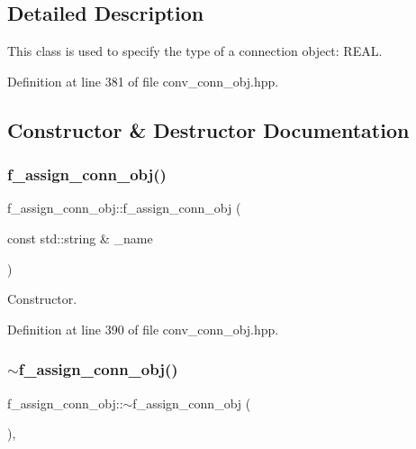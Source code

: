 \subsection{Detailed Description}
This class is used to specify the type of a connection object\+: R\+E\+AL. 

Definition at line 381 of file conv\+\_\+conn\+\_\+obj.\+hpp.



\subsection{Constructor \& Destructor Documentation}
\mbox{\label{classf__assign__conn__obj_a555ff56711d5808d1cd3904b9672a767}} 
\subsubsection{\texorpdfstring{f\+\_\+assign\+\_\+conn\+\_\+obj()}{f\_assign\_conn\_obj()}}
{\footnotesize\ttfamily f\+\_\+assign\+\_\+conn\+\_\+obj\+::f\+\_\+assign\+\_\+conn\+\_\+obj (\begin{DoxyParamCaption}\item[{const std\+::string \&}]{\+\_\+name }\end{DoxyParamCaption})\hspace{0.3cm}{\ttfamily [inline]}}



Constructor. 



Definition at line 390 of file conv\+\_\+conn\+\_\+obj.\+hpp.

\mbox{\label{classf__assign__conn__obj_a8a742f50acd7fe98a066b4157be90606}} 
\subsubsection{\texorpdfstring{$\sim$f\+\_\+assign\+\_\+conn\+\_\+obj()}{~f\_assign\_conn\_obj()}}
{\footnotesize\ttfamily f\+\_\+assign\+\_\+conn\+\_\+obj\+::$\sim$f\+\_\+assign\+\_\+conn\+\_\+obj (\begin{DoxyParamCaption}{ }\end{DoxyParamCaption})\hspace{0.3cm}{\ttfamily [override]}, {\ttfamily [default]}}



